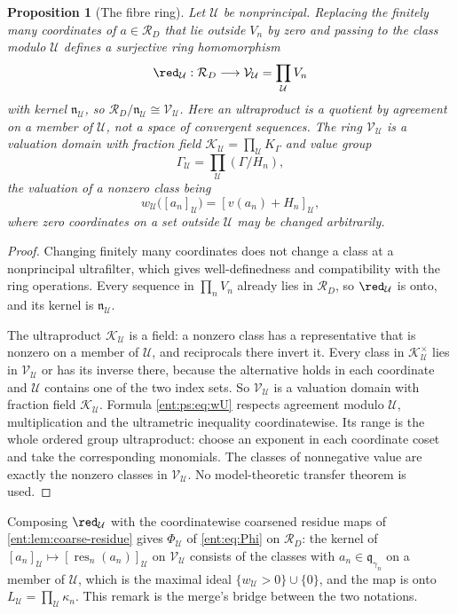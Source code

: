\documentclass[11pt]{article}
\theoremstyle{plain}
\theoremstyle{plain}
\newtheorem{proposition}[proposition]{Proposition}
\theoremstyle{plain}
\theoremstyle{definition}
\theoremstyle{definition}
\theoremstyle{definition}
\theoremstyle{definition}
\theoremstyle{remark}
\newcommand{\RD}{\mathcal R_D}\newcommand{\Ucal}{\mathcal U}
\newcommand{\res}{\operatorname{res}}
\begin{document}
\begin{proposition}[The fibre ring]\label{ent:ps:prop:fibre}
Let $\Ucal$ be nonprincipal. Replacing the finitely many coordinates of
$a\in\RD$ that lie outside $V_n$ by zero and passing to the class modulo
$\Ucal$ defines a surjective ring homomorphism
\[
 \red_\Ucal:\RD\longrightarrow\mathcal V_\Ucal=\prod_\Ucal V_n
\]
with kernel $\mathfrak n_\Ucal$, so $\RD/\mathfrak n_\Ucal\cong\mathcal
V_\Ucal$. Here an ultraproduct is a quotient by agreement on a member of
$\Ucal$, not a space of convergent sequences. The ring $\mathcal V_\Ucal$ is
a valuation domain with fraction field $\mathcal K_\Ucal=\prod_\Ucal K_\Gamma$
and value group
\[
 \Gamma_\Ucal=\prod_\Ucal(\Gamma/H_n),
\]
the valuation of a nonzero class being
\begin{equation}\label{ent:ps:eq:wU}
 w_\Ucal\bigl([a_n]_\Ucal\bigr)=[v(a_n)+H_n]_\Ucal ,
\end{equation}
where zero coordinates on a set outside $\Ucal$ may be changed arbitrarily.
\end{proposition}
\begin{proof}
Changing finitely many coordinates does not change a class at a nonprincipal
ultrafilter, which gives well-definedness and compatibility with the ring
operations. Every sequence in $\prod_nV_n$ already lies in $\RD$, so
$\red_\Ucal$ is onto, and its kernel is $\mathfrak n_\Ucal$.

The ultraproduct $\mathcal K_\Ucal$ is a field: a nonzero class has a
representative that is nonzero on a member of $\Ucal$, and reciprocals there
invert it. Every class in $\mathcal K_\Ucal^\times$ lies in $\mathcal V_\Ucal$
or has its inverse there, because the alternative holds in each coordinate
and $\Ucal$ contains one of the two index sets. So $\mathcal V_\Ucal$ is a
valuation domain with fraction field $\mathcal K_\Ucal$. Formula
\eqref{ent:ps:eq:wU} respects agreement modulo $\Ucal$, multiplication and
the ultrametric inequality coordinatewise. Its range is the whole ordered
group ultraproduct: choose an exponent in each coordinate coset and take the
corresponding monomials. The classes of nonnegative value are exactly the
nonzero classes in $\mathcal V_\Ucal$. No model-theoretic transfer theorem is
used.
\end{proof}

Composing $\red_\Ucal$ with the coordinatewise coarsened residue maps of
\cref{ent:lem:coarse-residue} gives $\Phi_\Ucal$ of \eqref{ent:eq:Phi} on
$\RD$: the kernel of $[a_n]_\Ucal\mapsto[\res_n(a_n)]_\Ucal$ on $\mathcal
V_\Ucal$ consists of the classes with $a_n\in\mathfrak q_{\gamma_n}$ on a
member of $\Ucal$, which is the maximal ideal $\{w_\Ucal>0\}\cup\{0\}$, and
the map is onto $L_\Ucal=\prod_\Ucal\kappa_n$. This remark is the merge's
bridge between the two notations.
\end{document}
